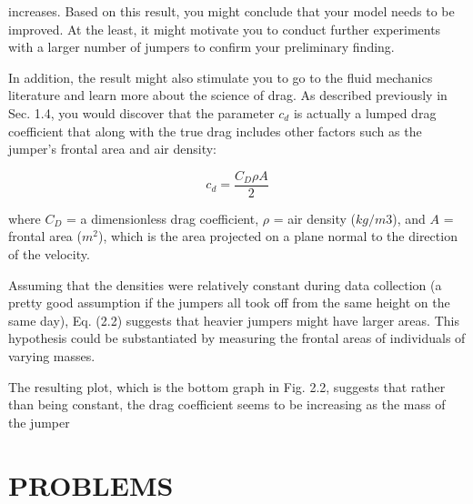 \documentclass[../main.tex]{subfiles}
\begin{document}
increases. Based on this result, you might conclude that your model needs to be improved.
At the least, it might motivate you to conduct further experiments with a larger number of
jumpers to confirm your preliminary finding.


In addition, the result might also stimulate you to go to the fluid mechanics literature and
learn more about the science of drag. As described previously in Sec. 1.4, you would discover that the parameter 
$c_d$ is actually a 
lumped drag coefficient that along with the true
drag includes other factors such as the jumper’s frontal area and air density:

\begin{equation}
	\tag{2.2}
	c_d=\dfrac{C_D \rho A}{2}
\end{equation}

where $C_D$ = a dimensionless drag coefficient, $\rho$ = air density ($kg/m3$), and $A$ = frontal
area ($m^2$), which is the area projected on a plane normal to the direction of the velocity.


Assuming that the densities were relatively constant during data collection (a pretty
good assumption if the jumpers all took off from the same height on the same day), Eq. (2.2)
suggests that heavier jumpers might have larger areas. This hypothesis could be substantiated by measuring the frontal
 areas of individuals of varying masses.


The resulting plot, which is the bottom graph in Fig. 2.2, suggests that rather than
being constant, the drag coefficient seems to be increasing as the mass of the jumper

\bigskip
\section*{PROBLEMS}
\end{document}
